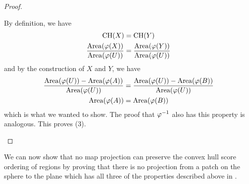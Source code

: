 \begin{proof}
\begin{enumerate}
By definition, we have
\begin{align*}
\mathrm{CH}(X) &= \mathrm{CH}(Y)\\
\frac{\mathrm{Area}(\varphi(X))}{\mathrm{Area}(\varphi(U))} &= \frac{\mathrm{Area}(\varphi(Y))}{\mathrm{Area}(\varphi(U))}
\end{align*}
and by the construction of $X$ and $Y$, we have 
\begin{align*}
\frac{\mathrm{Area}(\varphi(U)) - \mathrm{Area}(\varphi(A))}{\mathrm{Area}(\varphi(U))} &= \frac{\mathrm{Area}(\varphi(U)) - \mathrm{Area}(\varphi(B))}{\mathrm{Area}(\varphi(U))}\\
\mathrm{Area}(\varphi(A)) &= \mathrm{Area}(\varphi(B))
\end{align*}
 which is what we wanted to show.  The proof that $\varphi^{-1}$ also has this property is analogous.  This proves (3).
\end{enumerate}
\end{proof}

We can now show that no map projection can preserve the convex hull score ordering of regions by proving that there is no projection from a patch on the sphere to the plane which has all three of the properties described above in . 


